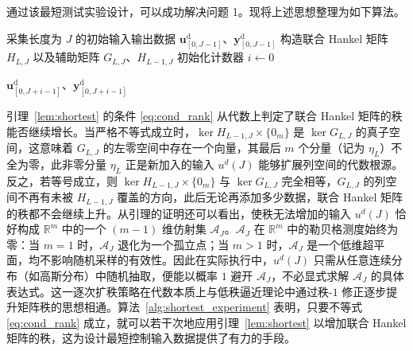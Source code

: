 通过该最短测试实验设计，可以成功解决问题 1。现将上述思想整理为如下算法。

\begin{algorithm}[H]
	\small
	\SetAlgoLined
	\LinesNumbered
	\caption{最短测试实验}
	\label{alg:shortest_experiment}


	\BlankLine
	采集长度为 $J$ 的初始输入输出数据 $\mathbf{u}^{\mathrm{d}}_{[0,J-1]}$、$\mathbf{y}^{\mathrm{d}}_{[0,J-1]}$\;
	构造联合 Hankel 矩阵 $H_{L,J}$ 以及辅助矩阵 $G_{L,J}$、$H_{L-1,J}$\;
	初始化计数器 $i \leftarrow 0$\;

	\BlankLine
	\Return $\mathbf{u}^{\mathrm{d}}_{[0,J+i-1]}$、$\mathbf{y}^{\mathrm{d}}_{[0,J+i-1]}$
\end{algorithm}

引理~\ref{lem:shortest} 的条件 \eqref{eq:cond_rank} 从代数上判定了联合 Hankel 矩阵的秩能否继续增长。当严格不等式成立时，$\ker H_{L-1,J} \times \{0_m\}$ 是 $\ker G_{L,J}$ 的真子空间，这意味着 $G_{L,J}$ 的左零空间中存在一个向量，其最后 $m$ 个分量（记为 $\eta_L$）不全为零，此非零分量 $\eta_L$ 正是新加入的输入 $u^d(J)$ 能够扩展列空间的代数根源。反之，若等号成立，则 $\ker H_{L-1,J} \times \{0_m\}$ 与 $\ker G_{L,J}$ 完全相等，$G_{L,J}$ 的列空间不再有未被 $H_{L-1,J}$ 覆盖的方向，此后无论再添加多少数据，联合 Hankel 矩阵的秩都不会继续上升。从引理的证明还可以看出，使秩无法增加的输入 $u^d(J)$ 恰好构成 $\mathbb{R}^m$ 中的一个 $(m-1)$ 维仿射集 $\mathcal{A}_J$。$\mathcal{A}_J$ 在 $\mathbb{R}^m$ 中的勒贝格测度始终为零：当 $m=1$ 时，$\mathcal{A}_J$ 退化为一个孤立点；当 $m>1$ 时，$\mathcal{A}_J$ 是一个低维超平面，均不影响随机采样的有效性。因此在实际执行中，$u^d(J)$ 只需从任意连续分布（如高斯分布）中随机抽取，便能以概率 $1$ 避开 $\mathcal{A}_J$，不必显式求解 $\mathcal{A}_J$ 的具体表达式。这一逐次扩秩策略在代数本质上与低秩逼近理论中通过秩-$1$ 修正逐步提升矩阵秩的思想相通。算法~\ref{alg:shortest_experiment} 表明，只要不等式 \eqref{eq:cond_rank} 成立，就可以若干次地应用引理~\ref{lem:shortest} 以增加联合 Hankel 矩阵的秩，这为设计最短控制输入数据提供了有力的手段。

